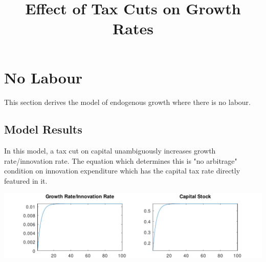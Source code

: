 \documentclass[a4paper 12pt]{article}
\title{Effect of Tax Cuts on Growth Rates}
\begin{document}
\maketitle

\section{No Labour}

This section derives the model of endogenous growth where there is no labour. 

\subsection{Model Results}

In this model, a tax cut on capital unambiguously increases growth rate/innovation rate. The equation which determines this is
"no arbitrage" condition on innovation expenditure which has the capital tax rate directly featured in it.

\begin{center}
\includegraphics[scale = 0.8]{../product/irfs_nolab.pdf}
\end{center}
\end{document}
